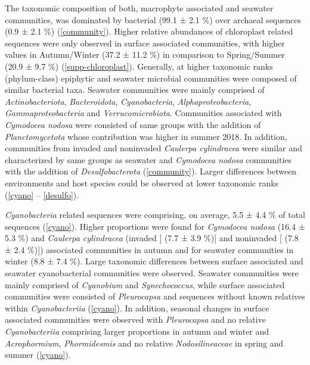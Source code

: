 \documentclass[12pt,]{article}
\begin{document}
The taxonomic composition of both, macrophyte associated and seawater
communities, was dominated by bacterial (99.1 ± 2.1 \si{\percent}) over
archaeal sequences (0.9 ± 2.1 \si{\percent}) (\autoref{community}).
Higher relative abundances of chloroplast related sequences were only
observed in surface associated communities, with higher values in
Autumn/Winter (37.2 ± 11.2 \si{\percent}) in comparison to Spring/Summer
(20.9 ± 9.7 \si{\percent}) (\autoref{supp-chloroplast}). Generally, at
higher taxonomic ranks (phylum-class) epiphytic and seawater microbial
communities were composed of similar bacterial taxa. Seawater
communities were mainly comprised of \emph{Actinobacteriota},
\emph{Bacteroidota}, \emph{Cyanobacteria}, \emph{Alphaproteobacteria},
\emph{Gammaproteobacteria} and \emph{Verrucomicrobiota}. Communities
associated with \emph{Cymodocea nodosa} were consisted of same groups
with the addition of \emph{Planctomycetota} whose contribution was
higher in summer 2018. In addition, communities from invaded and
noninvaded \emph{Caulerpa cylindracea} were similar and characterized by
same groups as seawater and \emph{Cymodocea nodosa} communities with the
addition of \emph{Desulfobacterota} (\autoref{community}). Larger
differences between environments and host species could be observed at
lower taxonomic ranks (\autoref{cyano} -- \ref{desulfo}).

\emph{Cyanobacteria} related sequences were comprising, on average, 5.5
± 4.4 \si{\percent} of total sequences (\autoref{cyano}). Higher
proportions were found for \emph{Cymodocea nodosa} (16.4 ± 5.3
\si{\percent}) and \emph{Caulerpa cylindracea} (invaded {[} (7.7 ± 3.9
\si{\percent}){]} and noninvaded {[} (7.8 ± 2.4 \si{\percent}){]})
associated communities in autumn and for seawater communities in winter
(8.8 ± 7.4 \si{\percent}). Large taxonomic differences between surface
associated and seawater cyanobacterial communities were observed.
Seawater communities were mainly comprised of \emph{Cyanobium} and
\emph{Synechococcus}, while surface associated communities were
consisted of \emph{Pleurocapsa} and sequences without known relatives
within \emph{Cyanobacteriia} (\autoref{cyano}). In addition, seasonal
changes in surface associated communities were observed with
\emph{Pleurocapsa} and no relative \emph{Cyanobacteriia} comprising
larger proportions in autumn and winter and \emph{Acrophormium},
\emph{Phormidesmis} and no relative \emph{Nodosilineaceae} in spring and
summer (\autoref{cyano}).
\end{document}

